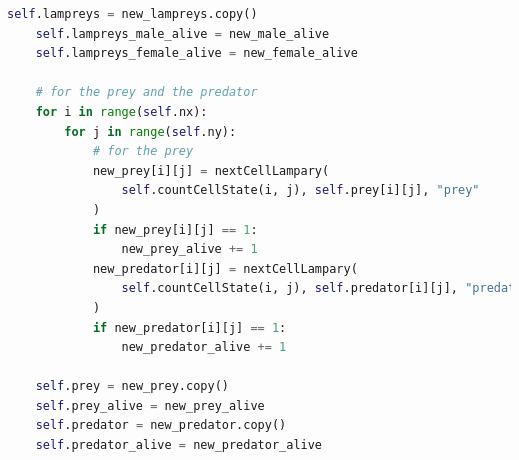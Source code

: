 \documentclass{mcmthesis}
\begin{document}
\begin{appendices}
\begin{lstlisting}[language=python]
    self.lampreys = new_lampreys.copy()
    self.lampreys_male_alive = new_male_alive
    self.lampreys_female_alive = new_female_alive

    # for the prey and the predator
    for i in range(self.nx):
        for j in range(self.ny):
            # for the prey
            new_prey[i][j] = nextCellLampary(
                self.countCellState(i, j), self.prey[i][j], "prey"
            )
            if new_prey[i][j] == 1:
                new_prey_alive += 1
            new_predator[i][j] = nextCellLampary(
                self.countCellState(i, j), self.predator[i][j], "predator"
            )
            if new_predator[i][j] == 1:
                new_predator_alive += 1

    self.prey = new_prey.copy()
    self.prey_alive = new_prey_alive
    self.predator = new_predator.copy()
    self.predator_alive = new_predator_alive
\end{lstlisting}

\end{appendices}
\end{document}
